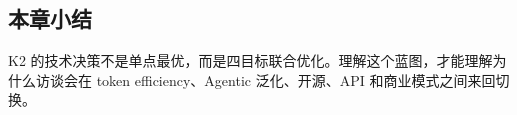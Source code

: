 \subsection{本章小结}

K2 的技术决策不是单点最优，而是四目标联合优化。理解这个蓝图，才能理解为什么访谈会在 token efficiency、Agentic 泛化、开源、API 和商业模式之间来回切换。

